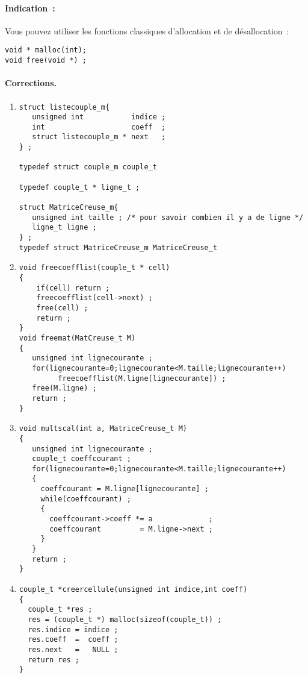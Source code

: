 \paragraph{Indication~:} Vous pouvez utiliser les fonctions classiques
d'allocation et de d\'esallocation~:
\begin{verbatim}
void * malloc(int);
void free(void *) ;
\end{verbatim}
\ifcorrection
\paragraph{Corrections.}
\begin{enumerate}
\item 
\begin{verbatim}
struct listecouple_m{
   unsigned int           indice ;
   int                    coeff  ;
   struct listecouple_m * next   ;
} ;

typedef struct couple_m couple_t

typedef couple_t * ligne_t ;

struct MatriceCreuse_m{
   unsigned int taille ; /* pour savoir combien il y a de ligne */
   ligne_t ligne ;
} ;
typedef struct MatriceCreuse_m MatriceCreuse_t
\end{verbatim}
\item 
\begin{verbatim}
void freecoefflist(couple_t * cell)
{
    if(cell) return ;
    freecoefflist(cell->next) ;
    free(cell) ;
    return ;
}
void freemat(MatCreuse_t M)
{
   unsigned int lignecourante ;
   for(lignecourante=0;lignecourante<M.taille;lignecourante++) 
         freecoefflist(M.ligne[lignecourante]) ;
   free(M.ligne) ;
   return ;
}
\end{verbatim}
\item 
\begin{verbatim}
void multscal(int a, MatriceCreuse_t M)
{
   unsigned int lignecourante ;
   couple_t coeffcourant ;
   for(lignecourante=0;lignecourante<M.taille;lignecourante++) 
   {
     coeffcourant = M.ligne[lignecourante] ;
     while(coeffcourant) ;
     {
       coeffcourant->coeff *= a             ;
       coeffcourant         = M.ligne->next ;
     }
   }
   return ; 
}
\end{verbatim}
\item 
\begin{verbatim}
couple_t *creercellule(unsigned int indice,int coeff)
{
  couple_t *res ;
  res = (couple_t *) malloc(sizeof(couple_t)) ;
  res.indice = indice ;
  res.coeff  =  coeff ;
  res.next   =   NULL ;
  return res ;
}


\end{verbatim}
\end{enumerate}
